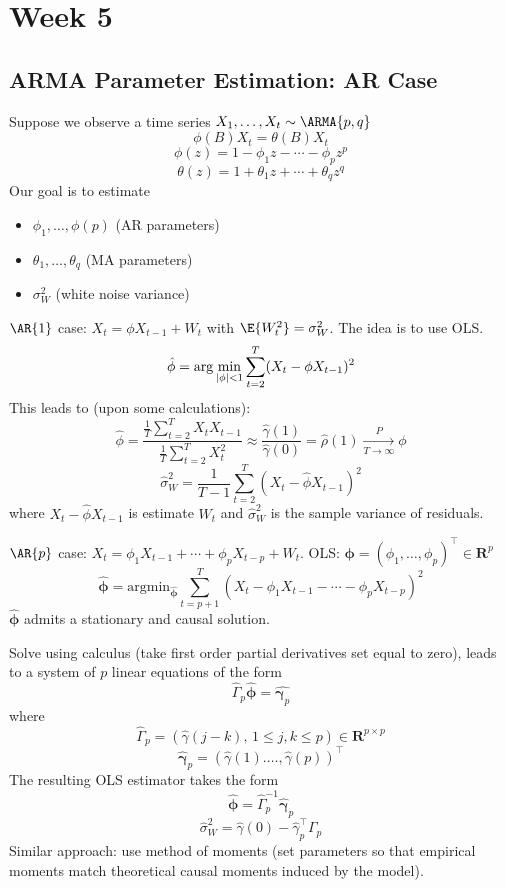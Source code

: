 \chapter{Week 5}
\section{ARMA Parameter Estimation: AR Case}
Suppose we observe a time series
$ X_1,\ldots,X_t \sim \ARMA{p,q} $
\[ \phi(B)X_t=\theta(B)X_t \]
\[ \phi(z)=1-\phi_1 z-\cdots - \phi_p z^p \]
\[ \theta(z)=1+\theta_1 z+\cdots+\theta_q z^q \]
Our goal is to estimate
\begin{itemize}
    \item $ \phi_1,\ldots,\phi(p) $ (AR parameters)
    \item $ \theta_1,\ldots,\theta_q $ (MA parameters)
    \item $ \sigma_W^2 $ (white noise variance)
\end{itemize}
$ \AR{1} $ case: $ X_t=\phi X_{t-1}+W_t $ with $ \E{W_t^2}=\sigma_W^2 $.
The idea is to use OLS\@.
\[ \hat{\phi}=\arg\min_{\lvert\phi\rvert<1}\sum_{t=2}^{T} (X_t-\phi X_{t-1})^2 \]
This leads to (upon some calculations):
\[ \hat{\phi}=\frac{\frac{1}{T}  \sum_{t=2}^{T} X_t X_{t-1}}{\frac{1}{T} \sum_{t=2}^{T} X_t^2}
    \approx \frac{\hat{\gamma}(1)}{\hat{\gamma}(0)}=\hat{\rho}(1)
    \xrightarrow[T\to\infty]{P}\phi   \]
\[ \hat{\sigma}_W^2=\frac{1}{T-1} \sum_{t=2}^{T} (X_t-\hat{\phi}X_{t-1})^2 \]
where $ X_t-\hat{\phi}X_{t-1} $ is estimate $ W_t $ and $ \hat{\sigma}_W^2 $
is the sample variance of residuals.

$ \AR{p} $ case: $ X_t=\phi_1 X_{t-1}+\cdots+\phi_p X_{t-p}+W_t $.
OLS\@: $ \symbf{\phi}=(\phi_1,\ldots,\phi_p)^\top \in\mathbf{R}^p $
\[ \hat{\symbf{\phi}}=\text{argmin}_{\hat{\symbf{\phi}}}\sum_{t=p+1}^{T} (X_t-\phi_1X_{t-1}-\cdots-\phi_p X_{t-p})^2 \]
$\hat{\symbf{\phi}}$ admits a stationary and causal solution.

Solve using calculus (take first order partial derivatives set equal to zero),
leads to a system of $ p $ linear equations of the form
\[ \hat{\Gamma}_p \symbf{\hat{\phi}}=\hat{\symbf{\gamma}_p} \]
where
\[ \hat{\Gamma}_p=(\hat{\gamma}(j-k),\, 1\le j,k\le p)\in\mathbf{R}^{p\times p} \]
\[ \symbf{\hat{\gamma}}_p=(\hat{\gamma}(1).\ldots,\hat{\gamma}(p))^\top \]
The resulting OLS estimator takes the form
\[ \hat{\symbf{\phi}}=\hat{\Gamma}_p^{-1}\hat{\symbf{\gamma}}_p \]
\[ \hat{\sigma}_W^2=\hat{\gamma}(0)-\hat{\gamma}_p^\top \Gamma_p \]
Similar approach: use method of moments (set parameters so that
empirical moments match theoretical causal moments induced by the model).

